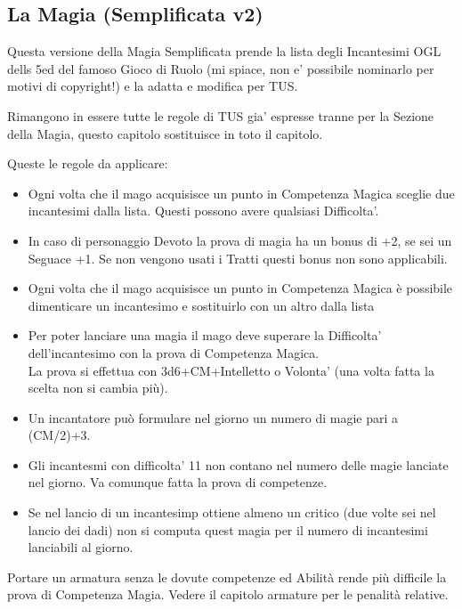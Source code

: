 \subsection{La Magia (Semplificata v2)}

\begin{multicols}{2}

Questa versione della Magia Semplificata prende la lista degli Incantesimi OGL dells 5ed del famoso Gioco di Ruolo (mi spiace, non e' possibile nominarlo per motivi di copyright!) e la adatta e modifica per TUS.


Rimangono in essere tutte le regole di TUS gia' espresse tranne per la Sezione della Magia, questo capitolo sostituisce in toto il capitolo.

Queste le regole da applicare:\\
\begin{itemize}

\item 
Ogni volta che il mago acquisisce un punto in Competenza Magica sceglie due incantesimi dalla lista. Questi possono avere qualsiasi Difficolta'.
\item 
In caso di personaggio Devoto la prova di magia ha un bonus di +2, se sei un Seguace +1.
Se non vengono usati i Tratti questi bonus non sono applicabili.
\item
Ogni volta che il mago acquisisce un punto in Competenza Magica è possibile dimenticare un incantesimo e sostituirlo con un altro dalla lista
\item 
Per poter lanciare una magia il mago deve superare la Difficolta' dell'incantesimo con la prova di Competenza Magica.\\
La prova si effettua con 3d6+CM+Intelletto o Volonta' (una volta fatta la scelta non si cambia più).
\item 
Un incantatore può formulare nel giorno un numero di magie pari a (CM/2)+3.
\item 
Gli incantesmi con difficolta' 11 non contano nel numero delle magie lanciate nel giorno. Va comunque fatta la prova di competenze.
\item
Se nel lancio di un incantesimp ottiene almeno un critico (due volte sei nel lancio dei dadi) non si computa quest magia per il numero di incantesimi lanciabili al giorno.
\end{itemize}

Portare un armatura senza le dovute competenze ed Abilità rende più difficile la prova di Competenza Magia. Vedere il capitolo armature per le penalità relative.


\end{multicols}
